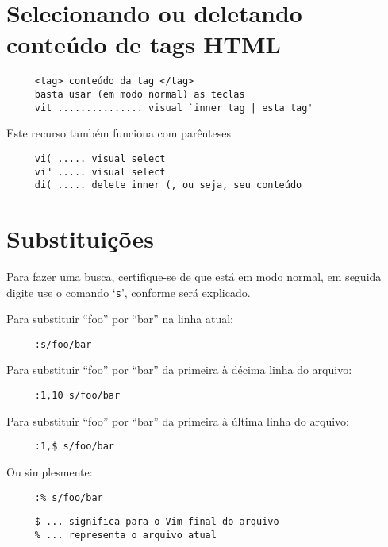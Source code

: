 \section{Selecionando ou deletando conteúdo de tags HTML}
\label{Selecionando ou deletando conteúdo de tags html}

\begin{verbatim}
     <tag> conteúdo da tag </tag>
     basta usar (em modo normal) as teclas
     vit ............... visual `inner tag | esta tag'
\end{verbatim}

Este recurso também funciona com parênteses

\begin{verbatim}
     vi( ..... visual select
     vi" ..... visual select
     di( ..... delete inner (, ou seja, seu conteúdo
\end{verbatim}


\section{Substituições }
\label{Substituições }

Para fazer uma busca, certifique-se de que está em modo normal, em
seguida digite use o comando `{\tt s}', conforme será explicado.

Para substituir ``foo'' por ``bar'' na linha atual:

\begin{verbatim}
     :s/foo/bar
\end{verbatim}

Para substituir ``foo'' por ``bar'' da primeira à décima linha do arquivo:

\begin{verbatim}
     :1,10 s/foo/bar
\end{verbatim}

Para substituir ``foo'' por ``bar'' da primeira à última linha do arquivo:

\begin{verbatim}
     :1,$ s/foo/bar
\end{verbatim}

Ou simplesmente:

\begin{verbatim}
     :% s/foo/bar
\end{verbatim}

\begin{verbatim}
     $ ... significa para o Vim final do arquivo
     % ... representa o arquivo atual
\end{verbatim}

